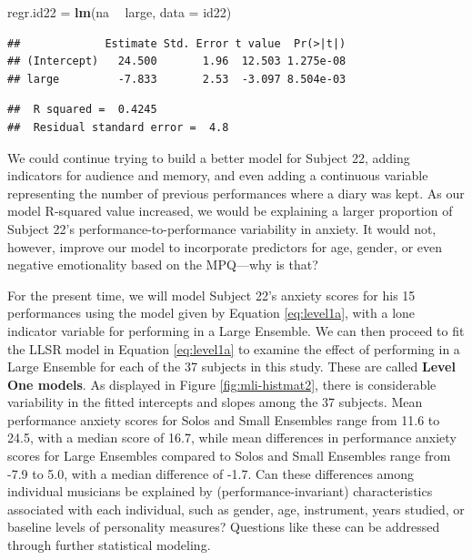 \documentclass[
]{krantz}
\newenvironment{Shaded}{\begin{snugshade}}{\end{snugshade}}
\newcommand{\DataTypeTok}[1]{\textcolor[rgb]{0.27,0.27,0.27}{#1}}
\newcommand{\KeywordTok}[1]{\textcolor[rgb]{0.27,0.27,0.27}{\textbf{#1}}}
\newcommand{\NormalTok}[1]{#1}
\newcommand{\OperatorTok}[1]{\textcolor[rgb]{0.43,0.43,0.43}{\textbf{#1}}}
\newcommand{\StringTok}[1]{\textcolor[rgb]{0.5,0.5,0.5}{#1}}
\begin{document}
\begin{Shaded}
\begin{Highlighting}[]
\NormalTok{regr.id22 =}\StringTok{ }\KeywordTok{lm}\NormalTok{(na }\OperatorTok{~}\StringTok{ }\NormalTok{large, }\DataTypeTok{data =}\NormalTok{ id22)}
\end{Highlighting}
\end{Shaded}

\begin{verbatim}
##             Estimate Std. Error t value  Pr(>|t|)
## (Intercept)   24.500       1.96  12.503 1.275e-08
## large         -7.833       2.53  -3.097 8.504e-03
\end{verbatim}

\begin{verbatim}
##  R squared =  0.4245 
##  Residual standard error =  4.8
\end{verbatim}

We could continue trying to build a better model for Subject 22, adding indicators for audience and memory, and even adding a continuous variable representing the number of previous performances where a diary was kept. As our model R-squared value increased, we would be explaining a larger proportion of Subject 22's performance-to-performance variability in anxiety. It would not, however, improve our model to incorporate predictors for age, gender, or even negative emotionality based on the MPQ---why is that?

For the present time, we will model Subject 22's anxiety scores for his 15 performances using the model given by Equation \eqref{eq:level1a}, with a lone indicator variable for performing in a Large Ensemble. We can then proceed to fit the LLSR model in Equation \eqref{eq:level1a} to examine the effect of performing in a Large Ensemble for each of the 37 subjects in this study. These are called \textbf{Level One models}.  As displayed in Figure \ref{fig:mli-histmat2}, there is considerable variability in the fitted intercepts and slopes among the 37 subjects. Mean performance anxiety scores for Solos and Small Ensembles range from 11.6 to 24.5, with a median score of 16.7, while mean differences in performance anxiety scores for Large Ensembles compared to Solos and Small Ensembles range from -7.9 to 5.0, with a median difference of -1.7. Can these differences among individual musicians be explained by (performance-invariant) characteristics associated with each individual, such as gender, age, instrument, years studied, or baseline levels of personality measures? Questions like these can be addressed through further statistical modeling.
\end{document}
